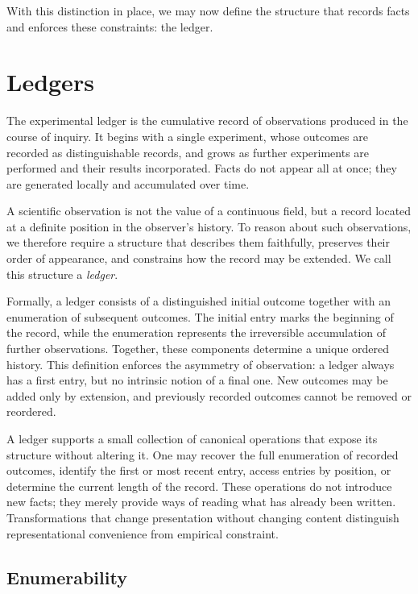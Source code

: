 With this distinction in place, we may now define the structure that records
facts and enforces these constraints: the ledger.

\section{Ledgers}
\label{sec:intro-ledger}

The experimental ledger is the cumulative record of observations produced in the
course of inquiry. It begins with a single experiment, whose outcomes are
recorded as distinguishable records, and grows as further experiments are
performed and their results incorporated. Facts do not appear all at once; they
are generated locally and accumulated over time.

A scientific observation is not the value of a continuous field, but a
record located at a definite position in the observer’s history.
To reason about such observations, we therefore require a structure that describes
them faithfully, preserves their order of appearance, and constrains how the
record may be extended. We call this structure a \emph{ledger}.

Formally, a ledger consists of a distinguished initial outcome together with an
enumeration of subsequent outcomes. The initial entry marks the beginning of the
record, while the enumeration represents the irreversible accumulation of
further observations. Together, these components determine a unique ordered
history. This definition enforces the asymmetry of observation: a ledger always
has a first entry, but no intrinsic notion of a final one. New outcomes may be
added only by extension, and previously recorded outcomes cannot be removed or
reordered.

A ledger supports a small collection of canonical operations that expose its
structure without altering it. One may recover the full enumeration of recorded
outcomes, identify the first or most recent entry, access entries by position, or
determine the current length of the record. These operations do not introduce new
facts; they merely provide ways of reading what has already been written.
Transformations that change presentation without changing content distinguish
representational convenience from empirical constraint.


\subsection{Enumerability}

